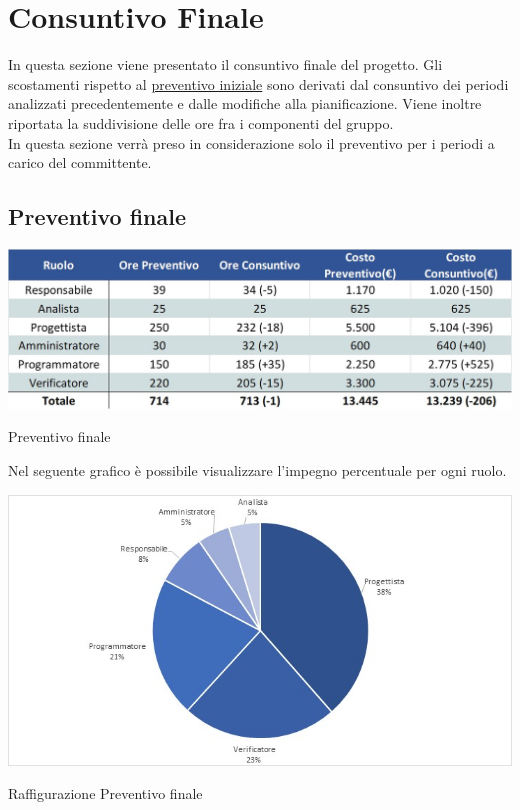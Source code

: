 \newpage
\section{Consuntivo Finale} \label{Consuntivo Finale}

In questa sezione viene presentato il consuntivo finale del progetto. Gli scostamenti rispetto al \hyperref[Preventivo]{preventivo iniziale} sono derivati dal consuntivo dei periodi analizzati precedentemente e dalle modifiche alla pianificazione. Viene inoltre riportata la suddivisione delle ore fra i componenti del gruppo. \\
In questa sezione verrà preso in considerazione solo il preventivo per i periodi a carico del committente.

\subsection{Preventivo finale}
\begin{table}[h!]
	\centerline{\includegraphics[scale=0.60]{img/Preventivo/Consuntivo/PreventivoFinire.jpg}}
	\caption{Preventivo finale}
\end{table}

Nel seguente grafico è possibile visualizzare l'impegno percentuale per ogni ruolo.

\begin{table}[h!]
	\centerline{\includegraphics[scale=0.80]{img/Preventivo/Torte/PreventivoFinire.jpg}}
	\caption{Raffigurazione Preventivo finale}
\end{table}

